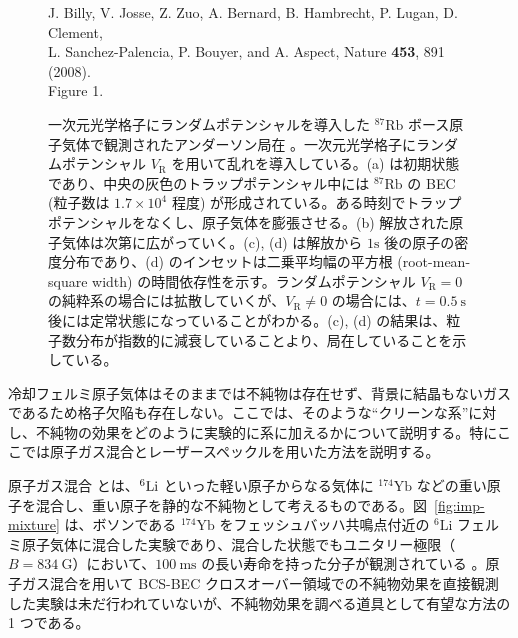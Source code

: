\begin{figure}[t]
\centering
\vspace{30mm}  
J. Billy, V. Josse, Z. Zuo, A. Bernard, B. Hambrecht, P. Lugan, D. Clement,\\ L. Sanchez-Palencia, P. Bouyer, and A. Aspect, Nature {\bf 453}, 891 (2008).\\
Figure 1.
\vspace{30mm}
\caption{一次元光学格子にランダムポテンシャルを導入した ${}^{87}\mathrm{Rb}$ ボース原子気体で観測されたアンダーソン局在 \cite{billy2008}。一次元光学格子にランダムポテンシャル $V_{\text{R}}$ を用いて乱れを導入している。(a) は初期状態であり、中央の灰色のトラップポテンシャル中には ${}^{87}\mathrm{Rb}$ の BEC (粒子数は $1.7 \times 10^4$ 程度) が形成されている。ある時刻でトラップポテンシャルをなくし、原子気体を膨張させる。(b) 解放された原子気体は次第に広がっていく。(c), (d) は解放から $1 \mathrm{s}$ 後の原子の密度分布であり、(d) のインセットは二乗平均幅の平方根 (root-mean-square width) の時間依存性を示す。ランダムポテンシャル $V_{\text{R}} =0$ の純粋系の場合には拡散していくが、$V_{\text{R}}\neq0$ の場合には、$t=0.5\ \text{s}$ 後には定常状態になっていることがわかる。(c), (d) の結果は、粒子数分布が指数的に減衰していることより、局在していることを示している。}
\label{fig:imp-localization}
\end{figure}



冷却フェルミ原子気体はそのままでは不純物は存在せず、背景に結晶もないガスであるため格子欠陥も存在しない。ここでは、そのような“クリーンな系”に対し、不純物の効果をどのように実験的に系に加えるかについて説明する。特にここでは原子ガス混合とレーザースペックルを用いた方法を説明する。


原子ガス混合 \cite{kharamov2012,konishi2016,hansen2011,kharamov2013,kharamov2014,hara2014} とは、${}^6\mathrm{Li}$ といった軽い原子からなる気体に ${}^{174}\mathrm{Yb}$ などの重い原子を混合し、重い原子を静的な不純物として考えるものである。図~\ref{fig:imp-mixture} は、ボソンである ${}^{174}\mathrm{Yb}$ をフェッシュバッハ共鳴点付近の ${}^{6}\mathrm{Li}$ フェルミ原子気体に混合した実験であり、混合した状態でもユニタリー極限（$B=834\ \mathrm{G}$）において、$100\ \mathrm{ms}$ の長い寿命を持った分子が観測されている \cite{kharamov2012}。原子ガス混合を用いて BCS-BEC クロスオーバー領域での不純物効果を直接観測した実験は未だ行われていないが、不純物効果を調べる道具として有望な方法の 1 つである。


